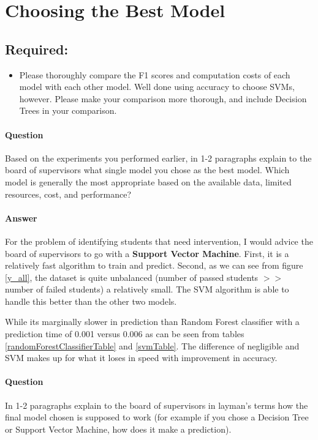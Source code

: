 \documentclass[12pt]{article}
\begin{document}

\section*{Choosing the Best Model}

\subsection*{Required:}
\begin{itemize} 

\item Please thoroughly compare the F1 scores and computation costs of each model with each other model.
Well done using accuracy to choose SVMs, however. Please make your comparison more thorough, and include Decision Trees in your comparison.
\end{itemize}

\paragraph{\textbf{Question}} Based on the experiments you performed earlier, in 1-2 paragraphs explain to the board of supervisors what single model you chose as the best model. Which model is generally the most appropriate based on the available data, limited resources, cost, and performance?



\paragraph{\textbf{Answer}} For the problem of identifying students that need intervention, I would advice the board of supervisors to go with a \textbf{Support Vector Machine}. First, it is a relatively fast algorithm to train and predict. 
Second, as we can see from figure \ref{y_all}, the dataset is quite unbalanced (number of passed students $>>$ number of failed students) a relatively small. The SVM algorithm is able to handle this better than the other two models. 

While its marginally slower in prediction than Random Forest classifier with a prediction time of 0.001 versus 0.006 as can be seen from tables \ref{randomForestClassifierTable} and \ref{svmTable}. The difference of negligible and SVM makes up for what it loses in speed with improvement in accuracy.


\paragraph{\textbf{Question}} In 1-2 paragraphs explain to the board of supervisors in layman's terms how the final model chosen is supposed to work (for example if you chose a Decision Tree or Support Vector Machine, how does it make a prediction).
\end{document}
